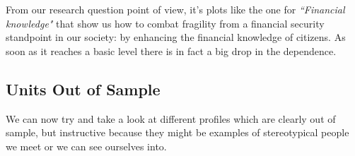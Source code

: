 \documentclass[a4paper,11pt]{article}
\begin{document}
From our research question point of view, it's plots like the one for \textit{``Financial knowledge"} that show us how to combat fragility from a financial security standpoint in our society: by enhancing the financial knowledge of citizens. As soon as it reaches a basic level there is in fact a big drop in the dependence. 

\subsection{Units Out of Sample}
We can now try and take a look at different profiles which are clearly out of sample, but instructive because they might be examples of stereotypical people we meet or we can see ourselves into. 
\begin{table}[H]
  \begin{center}
  
    
  \end{center}
 
  \caption{Six different profile creations}
\end{table}
\end{document}
